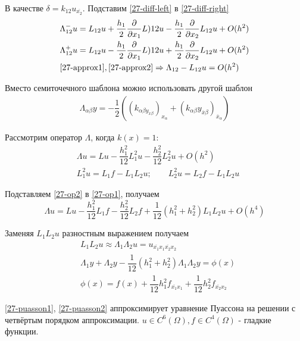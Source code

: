 В качестве $\delta = k_{12}u_{\overline{x_2}}$. Подставим \eqref{27-diff-left} в
\eqref{27-diff-right}
\begin{align}
  \label{27-approx1}
  &\Lambda_{12}^-u = L_{12}u + \dfrac{h_1}{2}\dfrac{\partial}{\partial x_1}L){12}u
  - \dfrac{h_1}{2}\dfrac{\partial}{\partial x_2}L_{12}u + O(h^2)\\
  \label{27-approx2}
  &\Lambda_{12}^+u = L_{12}u - \dfrac{h_1}{2}\dfrac{\partial}{\partial x_1}L){12}u
  + \dfrac{h_1}{2}\dfrac{\partial}{\partial x_2}L_{12}u + O(h^2)\\
  &\eqref{27-approx1}, \eqref{27-approx2} \Rightarrow \Lambda_{12} - L_{12}u = O(h^2)
\end{align}

\begin{note}
  Вместо семиточечного шаблона можно использовать другой шаблон
  \begin{align*}
    \Lambda_{\alpha\beta}y = -\dfrac{1}{2}((k_{\alpha\beta y_{x\beta}})_
    {x_{\alpha}} + (k_{\alpha\beta}y_{\overline{x}\beta})_{\overline{x}_{\alpha}})
  \end{align*}
\end{note}

Рассмотрим оператор $\Lambda$, когда $k(x) = 1$:
\begin{align}
  \label{27-op1}
  &\Lambda u = Lu - \dfrac{h_1^2}{12}L_1^2u - \dfrac{h_2^2}{12}L_2^2u + O(h^2)\\
  \label{27-op2}
  &L_1^2u = L_1f - L_1L_2u;\qquad L_2^2u = L_2f - L_1L_2u
\end{align}

Подставляем \eqref{27-op2} в \eqref{27-op1}, получаем
\begin{equation}
  \Lambda u = Lu - \dfrac{h_1^2}{12}L_1f - \dfrac{h_2^2}{12}L_2f +
  \dfrac{1}{12}(h_1^2 + h_2^2)L_1L_2u + O(h^4)
\end{equation}

Заменяя $L_1L_2u$ разностным выражением получаем
\begin{align}
  &L_1L_2u \approx \Lambda_1\Lambda_2 u = u_{\overline{x_1}x_1\overline{x_2}x_2}\\
  \label{27-puasson1}
  &\Lambda_1y + \Lambda_2y - \dfrac{1}{12}(h_1^2 + h_2^2)\Lambda_1\Lambda_2y = \phi(x)\\
  \label{27-puasson2}
  &\phi(x) = f(x) + \dfrac{1}{12}h_1^2f_{\overline{x_1}x_1} + \dfrac{1}{12}h_2^2
  f_{\overline{x_2}x_2}
\end{align}

\eqref{27-puasson1}, \eqref{27-puasson2} аппроксимирует уравнение Пуассона на решении
с четвёртым порядком аппроксимации. ${u \in C^6(\Omega), f \in C^4(\Omega)}$ - гладкие
функции.
